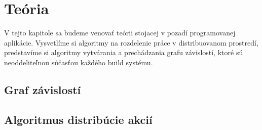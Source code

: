 \chapter{Te\'{o}ria}
\label{ch:theory}

V tejto kapitole sa budeme venovať teórii stojacej v pozadí programovanej aplikácie.
Vysvetlíme si algoritmy na rozdelenie práce v distribuovanom prostredí, predstavíme
si algoritmy vytvárania a prechádzania grafu závislostí, ktoré sú neoddeliteľnou
súčasťou každého build systému.

\section{Graf z\'{a}vislost\'{i}}
\label{sec:depgraph}

\section{Algoritmus distrib\'{u}cie akci\'{i}}
\label{sec:actiondistrib}
